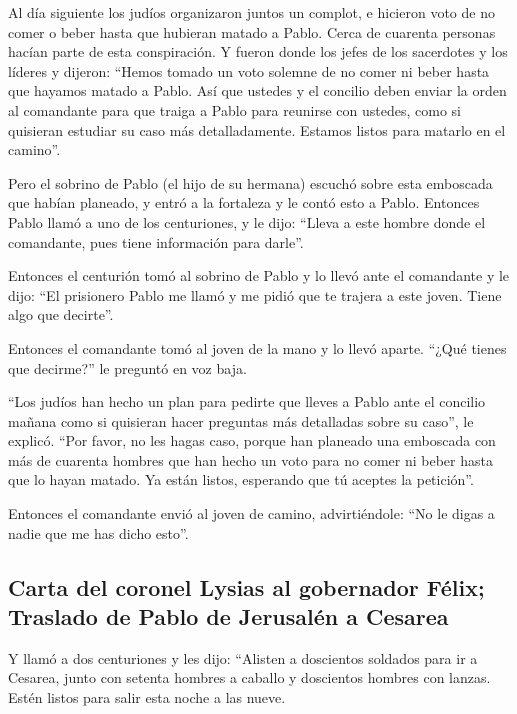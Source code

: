  Al día siguiente los judíos organizaron juntos un
complot, e hicieron voto de no comer o beber hasta que hubieran matado a
Pablo.  Cerca de cuarenta personas hacían parte de esta
conspiración.  Y fueron donde los jefes de los sacerdotes
y los líderes y dijeron: ``Hemos tomado un voto solemne de no comer ni
beber hasta que hayamos matado a Pablo.  Así que ustedes
y el concilio deben enviar la orden al comandante para que traiga a
Pablo para reunirse con ustedes, como si quisieran estudiar su caso más
detalladamente. Estamos listos para matarlo en el camino''.

 Pero el sobrino de Pablo (el hijo de su hermana) escuchó
sobre esta emboscada que habían planeado, y entró a la fortaleza y le
contó esto a Pablo.  Entonces Pablo llamó a uno de los
centuriones, y le dijo: ``Lleva a este hombre donde el comandante, pues
tiene información para darle''.

 Entonces el centurión tomó al sobrino de Pablo y lo
llevó ante el comandante y le dijo: ``El prisionero Pablo me llamó y me
pidió que te trajera a este joven. Tiene algo que decirte''.

 Entonces el comandante tomó al joven de la mano y lo
llevó aparte. ``¿Qué tienes que decirme?'' le preguntó en voz baja.

 ``Los judíos han hecho un plan para pedirte que lleves a
Pablo ante el concilio mañana como si quisieran hacer preguntas más
detalladas sobre su caso'', le explicó.  ``Por favor, no
les hagas caso, porque han planeado una emboscada con más de cuarenta
hombres que han hecho un voto para no comer ni beber hasta que lo hayan
matado. Ya están listos, esperando que tú aceptes la petición''.

 Entonces el comandante envió al joven de camino,
advirtiéndole: ``No le digas a nadie que me has dicho esto''.

\hypertarget{carta-del-coronel-lysias-al-gobernador-fuxe9lix-traslado-de-pablo-de-jerusaluxe9n-a-cesarea}{%
\subsection{Carta del coronel Lysias al gobernador Félix; Traslado de
Pablo de Jerusalén a
Cesarea}\label{carta-del-coronel-lysias-al-gobernador-fuxe9lix-traslado-de-pablo-de-jerusaluxe9n-a-cesarea}}

 Y llamó a dos centuriones y les dijo: ``Alisten a
doscientos soldados para ir a Cesarea, junto con setenta hombres a
caballo y doscientos hombres con lanzas. Estén listos para salir esta
noche a las nueve.

